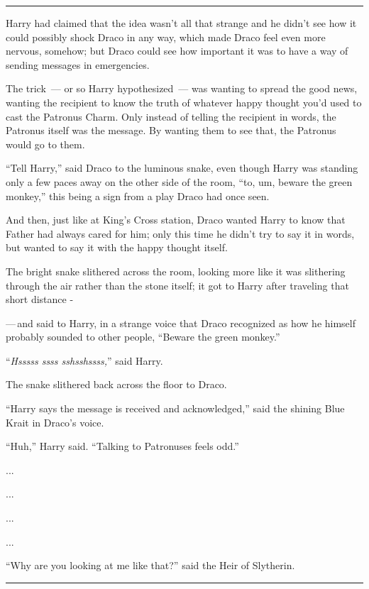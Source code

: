 \begin{center}\rule{3in}{0.4pt}\end{center}

Harry had claimed that the idea wasn't all that strange and he didn't see how it could possibly shock Draco in any way, which made Draco feel even more nervous, somehow; but Draco could see how important it was to have a way of sending messages in emergencies.

The trick~--- or so Harry hypothesized~--- was wanting to spread the good news, wanting the recipient to know the truth of whatever happy thought you'd used to cast the Patronus Charm. Only instead of telling the recipient in words, the Patronus itself was the message. By wanting them to see that, the Patronus would go to them.

``Tell Harry,'' said Draco to the luminous snake, even though Harry was standing only a few paces away on the other side of the room, ``to, um, beware the green monkey,'' this being a sign from a play Draco had once seen.

And then, just like at King's Cross station, Draco wanted Harry to know that Father had always cared for him; only this time he didn't try to say it in words, but wanted to say it with the happy thought itself.

The bright snake slithered across the room, looking more like it was slithering through the air rather than the stone itself; it got to Harry after traveling that short distance -

---\,and said to Harry, in a strange voice that Draco recognized as how he himself probably sounded to other people, ``Beware the green monkey.''

``\emph{Hsssss ssss sshsshssss,}'' said Harry.

The snake slithered back across the floor to Draco.

``Harry says the message is received and acknowledged,'' said the shining Blue Krait in Draco's voice.

``Huh,'' Harry said. ``Talking to Patronuses feels odd.''

...

...

...

...

``Why are you looking at me like that?'' said the Heir of Slytherin.

\begin{center}\rule{3in}{0.4pt}\end{center}

